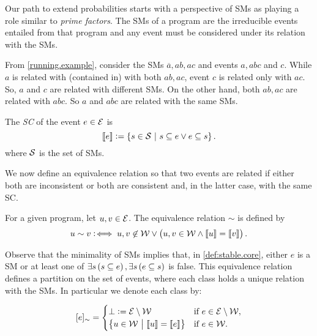 \documentclass{llncs}
\newcommand{\co}[1]{\ensuremath{\overline{#1}}}
\newcommand{\fml}[1]{\ensuremath{{\cal #1}}}
\newcommand{\stablecore}[1]{\ensuremath{\left\llbracket #1 \right\rrbracket}}
\newcommand{\class}[1]{\ensuremath{[{#1}]_{\sim}}}
\newcommand{\inconsistent}{\bot}
\newcommand{\given}{\ensuremath{~\middle|~}}
\begin{document}
Our path to extend probabilities starts with a perspective of \aclp{SM} as playing a role similar to \emph{prime factors}.  The \aclp{SM} of a program are the irreducible events entailed from that program and any event must be considered under its relation with the \aclp{SM}.

From  \cref{running.example}, consider the \acp{SM} $\co{a}, ab, ac$ and events $a, abc$ and $c$. While $a$ is related with (contained in) with both $ab, ac$, event $c$ is related only with $ac$. So, $a$ and $c$ are related with different \acp{SM}. On the other hand, both $ab, ac$ are related with $abc$. So $a$ and $abc$ are related with the same \aclp{SM}.

\begin{definition}\label{def:stable.core}
    The \emph{\ac{SC}} of the event $e\in \fml{E}$ is
    \begin{equation}
        \stablecore{e} := \set{s \in \fml{S} \given s \subseteq e \vee e \subseteq s}. \label{eq:stable.core}
    \end{equation}
    where $\fml{S}$ is the set of \aclp{SM}.
\end{definition}

We now define an equivalence relation so that two events are related if either both are inconsistent or both are consistent and, in the latter case, with the same \acl{SC}.

\begin{definition}\label{def:equiv.rel}
    For a given program, let $u, v \in \fml{E}$. The equivalence relation $\sim$ is defined by
    \begin{equation}
        u \sim v :\!\iff u,v \not\in\fml{W} \vee \del{u,v \in \fml{W} \wedge \stablecore{u} = \stablecore{v}}.\label{eq:equiv.rel}
    \end{equation}
\end{definition}

Observe that the minimality of \aclp{SM} implies that, in \cref{def:stable.core}, either $e$ is a \acl{SM} or at least one of $\exists s \del{s \subseteq e}, \exists s \del{e \subseteq s}$ is false. This equivalence relation defines a partition on the set of events, where each class holds a unique relation with the \aclp{SM}. In particular we denote each class by:

\begin{equation}
    \class{e} =
    \begin{cases}
        \inconsistent := \fml{E} \setminus \fml{W}
         & \text{if~} e \in \fml{E} \setminus \fml{W}, \\
        \set{u \in \fml{W} \given \stablecore{u} = \stablecore{e}}
         & \text{if~} e \in \fml{W}.
    \end{cases}\label{eq:event.class}
\end{equation}
\end{document}
